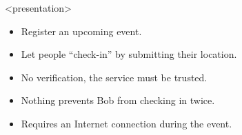 \begin{frame}<presentation>
  \begin{solution}
    \begin{itemize}
      \item Register an upcoming event.
      \item Let people \enquote{check-in} by submitting their location.
    \end{itemize}
  \end{solution}

  \pause

  \begin{remark}
    \begin{itemize}
      \item No verification, the service must be trusted.
      \item Nothing prevents Bob from checking in twice.
      \item Requires an Internet connection during the event.
    \end{itemize}
  \end{remark}
\end{frame}
